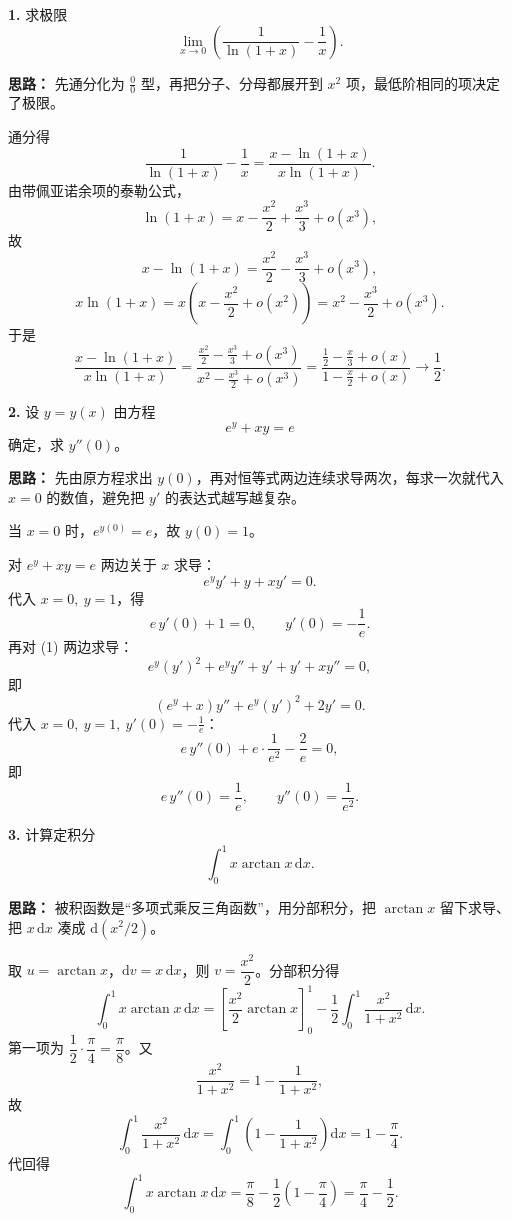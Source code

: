 \textbf{1.} 求极限
\[
\lim_{x\to 0}\left(\frac{1}{\ln(1+x)}-\frac{1}{x}\right).
\]

\ifshowsolutions%

\textbf{思路：} 先通分化为 $\frac00$ 型，再把分子、分母都展开到 $x^2$ 项，最低阶相同的项决定了极限。

通分得
\[
\frac{1}{\ln(1+x)}-\frac{1}{x}
=\frac{x-\ln(1+x)}{x\ln(1+x)}.
\]
由带佩亚诺余项的泰勒公式，
\[
\ln(1+x)=x-\frac{x^2}{2}+\frac{x^3}{3}+o(x^3),
\]
故
\[
x-\ln(1+x)=\frac{x^2}{2}-\frac{x^3}{3}+o(x^3),
\]
\[
x\ln(1+x)=x\left(x-\frac{x^2}{2}+o(x^2)\right)
=x^2-\frac{x^3}{2}+o(x^3).
\]
于是
\[
\frac{x-\ln(1+x)}{x\ln(1+x)}
=\frac{\frac{x^2}{2}-\frac{x^3}{3}+o(x^3)}
{x^2-\frac{x^3}{2}+o(x^3)}
=\frac{\frac12-\frac{x}{3}+o(x)}{1-\frac{x}{2}+o(x)}
\longrightarrow \frac12.
\]
\else \answerarea[5] \fi%

\textbf{2.} 设 $y=y(x)$ 由方程
\[
e^y+xy=e
\]
确定，求 $y''(0)$。

\ifshowsolutions%

\textbf{思路：} 先由原方程求出 $y(0)$，再对恒等式两边连续求导两次，每求一次就代入 $x=0$ 的数值，避免把 $y'$ 的表达式越写越复杂。

当 $x=0$ 时，$e^{y(0)}=e$，故 $y(0)=1$。

对 $e^y+xy=e$ 两边关于 $x$ 求导：
\[
e^y y'+y+xy'=0. \tag{1}
\]
代入 $x=0,\ y=1$，得
\[
e\,y'(0)+1=0,\qquad y'(0)=-\frac1e.
\]
再对 (1) 两边求导：
\[
e^y(y')^2+e^y y''+y'+y'+xy''=0,
\]
即
\[
(e^y+x)y''+e^y(y')^2+2y'=0. \tag{2}
\]
代入 $x=0,\ y=1,\ y'(0)=-\frac1e$：
\[
e\,y''(0)+e\cdot\frac{1}{e^2}-\frac{2}{e}=0,
\]
即
\[
e\,y''(0)=\frac{1}{e},\qquad y''(0)=\frac{1}{e^2}.
\]
\else \answerarea[5] \fi%

\textbf{3.} 计算定积分
\[
\int_0^1 x\arctan x\,\mathrm{d}x.
\]

\ifshowsolutions%

\textbf{思路：} 被积函数是“多项式乘反三角函数”，用分部积分，把 $\arctan x$ 留下求导、把 $x\,\mathrm{d}x$ 凑成 $\mathrm{d}(x^2/2)$。

取 $u=\arctan x$，$\mathrm{d}v=x\,\mathrm{d}x$，则 $v=\dfrac{x^2}{2}$。分部积分得
\[
\int_0^1 x\arctan x\,\mathrm{d}x
=\left[\frac{x^2}{2}\arctan x\right]_0^1
-\frac12\int_0^1\frac{x^2}{1+x^2}\,\mathrm{d}x.
\]
第一项为 $\dfrac12\cdot\dfrac{\pi}{4}=\dfrac{\pi}{8}$。又
\[
\frac{x^2}{1+x^2}=1-\frac{1}{1+x^2},
\]
故
\[
\int_0^1\frac{x^2}{1+x^2}\,\mathrm{d}x
=\int_0^1\left(1-\frac{1}{1+x^2}\right)\mathrm{d}x
=1-\frac{\pi}{4}.
\]
代回得
\[
\int_0^1 x\arctan x\,\mathrm{d}x
=\frac{\pi}{8}-\frac12\left(1-\frac{\pi}{4}\right)
=\frac{\pi}{4}-\frac12.
\]
\else \answerarea[6] \fi%


